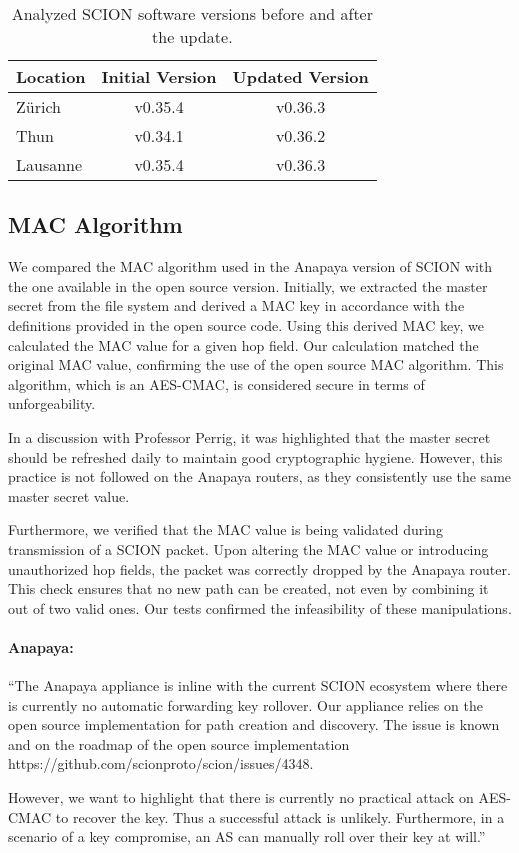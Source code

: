 \begin{table}[H]
    \centering
    \begin{tabular}{|l|c|c|}
        \hline
        \textbf{Location} & \textbf{Initial Version} & \textbf{Updated Version} \\
        \hline
        Zürich & v0.35.4 & v0.36.3 \\
        \hline
        Thun & v0.34.1 & v0.36.2 \\
        \hline
        Lausanne & v0.35.4 & v0.36.3 \\
        \hline
    \end{tabular}
    \caption{Analyzed SCION software versions before and after the update.}
    \label{tab:software_scion_versions}
\end{table}

\subsection{MAC Algorithm}
\label{sec:mac-algorithm}
We compared the MAC algorithm used in the Anapaya version of SCION with the one available in the open source version.
Initially, we extracted the master secret from the file system and derived a MAC key in accordance with the definitions provided in the open source code.
Using this derived MAC key, we calculated the MAC value for a given hop field.
Our calculation matched the original MAC value, confirming the use of the open source MAC algorithm.
This algorithm, which is an AES-CMAC, is considered secure in terms of unforgeability.

In a discussion with Professor Perrig, it was highlighted that the master secret should be refreshed daily to maintain good cryptographic hygiene.
However, this practice is not followed on the Anapaya routers, as they consistently use the same master secret value.

Furthermore, we verified that the MAC value is being validated during transmission of a SCION packet.
Upon altering the MAC value or introducing unauthorized hop fields, the packet was correctly dropped by the Anapaya router.
This check ensures that no new path can be created, not even by combining it out of two valid ones.
Our tests confirmed the infeasibility of these manipulations.

\begin{boxH}
\paragraph{Anapaya:}
``The Anapaya appliance is inline with the current SCION ecosystem where there is currently no automatic forwarding key rollover. Our appliance relies on the open source implementation for path creation and discovery.
The issue is known and on the roadmap of the open source implementation https://github.com/scionproto/scion/issues/4348.

However, we want to highlight that there is currently no practical attack on AES-CMAC to recover the key.
Thus a successful attack is unlikely. Furthermore, in a scenario of a key compromise, an AS can manually roll over their key at will.''
\end{boxH}

